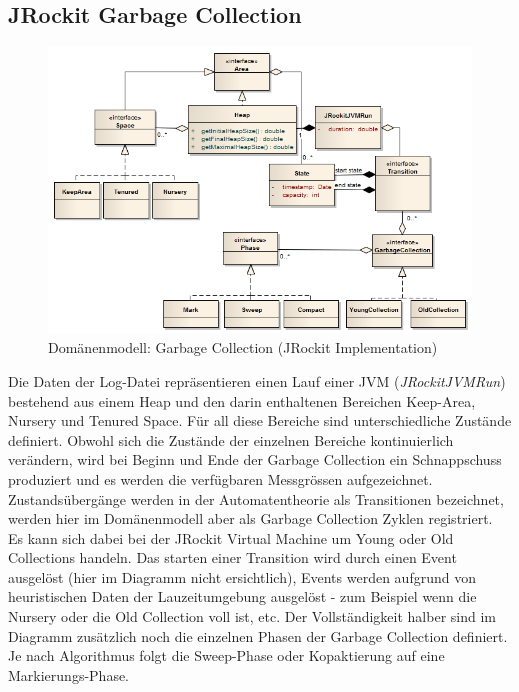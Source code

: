 \subsection{JRockit Garbage Collection}
\begin{landscape}
 \begin{figure}[H]
  	\centering
        	\caption{Domänenmodell: Garbage Collection (JRockit Implementation)}
    	\includegraphics[width=19.5cm]{images/jrockit_extension_domain}
\end{figure}
\end{landscape}

Die Daten der Log-Datei repräsentieren einen Lauf einer JVM (\textit{JRockitJVMRun}) bestehend aus einem Heap und den darin enthaltenen Bereichen Keep-Area, Nursery und Tenured Space. Für all diese Bereiche sind unterschiedliche Zustände definiert. Obwohl sich die Zustände der einzelnen Bereiche kontinuierlich verändern, wird bei Beginn und Ende der Garbage Collection ein Schnappschuss produziert und es werden die verfügbaren Messgrössen aufgezeichnet. Zustandsübergänge werden in der Automatentheorie als Transitionen bezeichnet, werden hier im Domänenmodell aber als Garbage Collection Zyklen 
registriert. Es kann sich dabei bei der JRockit Virtual Machine um Young oder Old Collections handeln. Das starten einer Transition wird durch einen Event ausgelöst (hier im Diagramm nicht ersichtlich), Events werden aufgrund von heuristischen Daten der Lauzeitumgebung ausgelöst - zum Beispiel wenn die Nursery oder die Old Collection voll ist, etc. Der Vollständigkeit halber sind im Diagramm zusätzlich noch die einzelnen Phasen der Garbage Collection definiert. Je nach Algorithmus folgt die Sweep-Phase oder Kopaktierung auf eine Markierungs-Phase.


